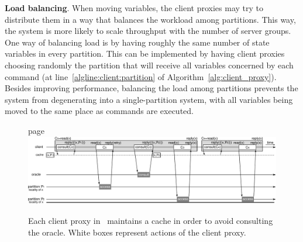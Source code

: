 \textbf{Load balancing}. When moving variables, the client proxies may try to
distribute them in a way that balances the workload among partitions. This way,
the system is more likely to scale throughput with the number of server groups.
One way of balancing load is by having roughly the same number of state
variables in every partition. This can be implemented by having client proxies
choosing randomly the partition that will receive all variables concerned by
each command (at line~\ref                {algline:client:partition} of
Algorithm~\ref{alg:client_proxy}). Besides improving performance, balancing the
load among partitions prevents the system from degenerating into a
single-partition system, with all variables being moved to the same place as
commands are executed.


\begin{figure}
\begin{minipage}[b]{1\linewidth} %
page
\centering
      \includegraphics[width=1.0\linewidth]{figures/dssmr-retry}
\end{minipage}
\caption{Each client proxy in \dssmr\ maintains a cache in order to avoid  consulting the oracle. White boxes represent actions of the client proxy.}
\label{fig:dssmr-retry}
\end{figure}

